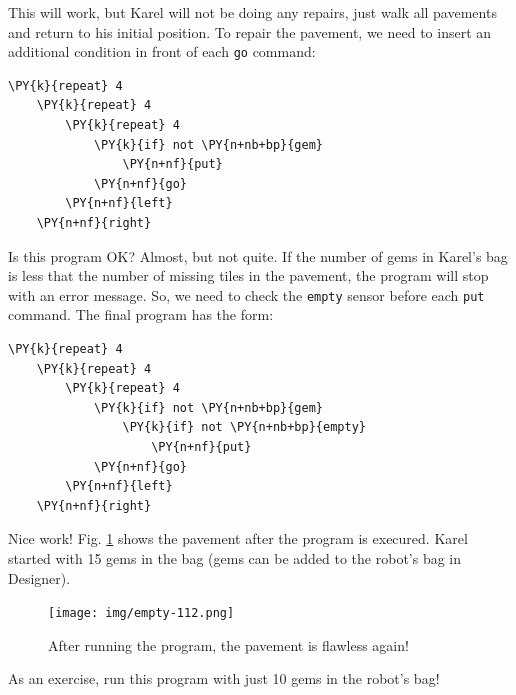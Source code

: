 \noindent
This will work, but Karel will not be doing any repairs, just walk
all pavements and return to his initial position.
To repair the pavement, we need to insert an additional condition in front 
of each {\tt go} command:\\

\begin{bbox}
\begin{Verbatim}[commandchars=\\\{\}]
\PY{k}{repeat} 4
    \PY{k}{repeat} 4
        \PY{k}{repeat} 4
            \PY{k}{if} not \PY{n+nb+bp}{gem}
                \PY{n+nf}{put}
            \PY{n+nf}{go}
        \PY{n+nf}{left}
    \PY{n+nf}{right}
\end{Verbatim}
\end{bbox}
\vspace{6mm}

\noindent
Is this program OK? Almost, but not quite. If the number of
gems in Karel's bag is less that the number of missing tiles
in the pavement, the program will stop with an error message. 
So, we need to check the {\tt empty} sensor before each {\tt put}
command. The final program has the form:\\

\begin{bbox}
\begin{Verbatim}[commandchars=\\\{\}]
\PY{k}{repeat} 4
    \PY{k}{repeat} 4
        \PY{k}{repeat} 4
            \PY{k}{if} not \PY{n+nb+bp}{gem}
                \PY{k}{if} not \PY{n+nb+bp}{empty}
                    \PY{n+nf}{put}
            \PY{n+nf}{go}
        \PY{n+nf}{left}
    \PY{n+nf}{right}
\end{Verbatim}
\end{bbox}
\vspace{6mm}

\noindent
Nice work! Fig. \ref{fig:empty-112} shows the pavement after the program 
is execured. Karel started with 15 gems in the bag (gems can be added to 
the robot's bag in Designer).

\begin{figure}[!ht]
\begin{center}
\texttt{[image: img/empty-112.png]}
\vspace{-0mm}
\caption{After running the program, the pavement is flawless again!}
\label{fig:empty-112}
\end{center}
\end{figure}
\noindent
As an exercise, run this program with just 10 gems in the robot's bag!
\newpage

